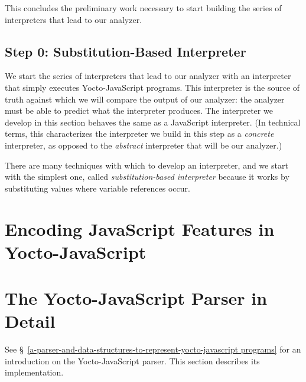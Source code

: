 \documentclass[12pt, oneside]{book}
\begin{document}
This concludes the preliminary work necessary to start building the series of interpreters that lead to our analyzer.

\section{Step 0: Substitution-Based Interpreter}

We start the series of interpreters that lead to our analyzer with an interpreter that simply executes Yocto-JavaScript programs. This interpreter is the source of truth against which we will compare the output of our analyzer: the analyzer must be able to predict what the interpreter produces. The interpreter we develop in this section behaves the same as a JavaScript interpreter. (In technical terms, this characterizes the interpreter we build in this step as a \emph{concrete} interpreter, as opposed to the \emph{abstract} interpreter that will be our analyzer.)

There are many techniques with which to develop an interpreter, and we start with the simplest one, called \emph{substitution-based interpreter} because it works by substituting values where variable references occur.


\appendix

\chapter{Encoding JavaScript Features in Yocto-JavaScript}
\label{encoding-javascript-features-in-yocto-javascript}


\chapter{The Yocto-JavaScript Parser in Detail}
\label{the-yocto-javascript-parser-in-detail}

See §~\ref{a-parser-and-data-structures-to-represent-yocto-javascript programs} for an introduction on the Yocto-JavaScript parser. This section describes its implementation.
\end{document}
